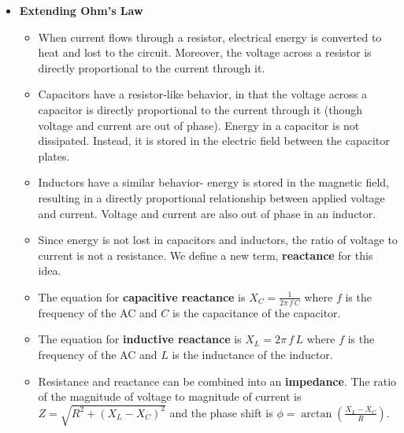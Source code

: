 \documentclass{article}
\begin{document}
\begin{itemize}
\item \textbf{Extending Ohm's Law}
  \begin{itemize}
    \item When current flows through a resistor, electrical energy is 
          converted to heat and lost to the circuit. Moreover, the voltage 
          across a resistor is directly proportional to the current through it.
    \item Capacitors have a resistor-like behavior, in that the voltage 
          across a capacitor is directly proportional to the current through it 
          (though voltage and current are out of phase). Energy in a capacitor 
          is not dissipated. Instead, it is stored in the electric field 
          between the capacitor plates.
    \item Inductors have a similar behavior- energy is stored in the magnetic 
          field, resulting in a directly proportional relationship between 
          applied voltage and current. Voltage and current are also out of phase
          in an inductor.
    \item Since energy is not lost in capacitors and inductors, the ratio of
          voltage to current is not a resistance. We define a new term,
          \textbf{reactance} for this idea.
    \item The equation for \textbf{capacitive reactance} is 
          $X_{C} = \frac{1}{2\pi\,f\,C}$ where $f$ is the frequency of the AC
          and $C$ is the capacitance of the capacitor.
    \item The equation for \textbf{inductive reactance} is 
          $X_{L} = 2\pi\,f\,L$ where $f$ is the frequency of the AC and $L$ is
          the inductance of the inductor.
    \item Resistance and reactance can be combined into an \textbf{impedance}.
          The ratio of the magnitude of voltage to magnitude of current is
          $Z = \sqrt{R^{2} + (X_{L} - X_{C})^{2}}$ and the phase shift is
          $\phi = \arctan \left ( \frac{X_{L}-X_{C}}{R} \right )$.
  \end{itemize}

\end{itemize}
\end{document}
